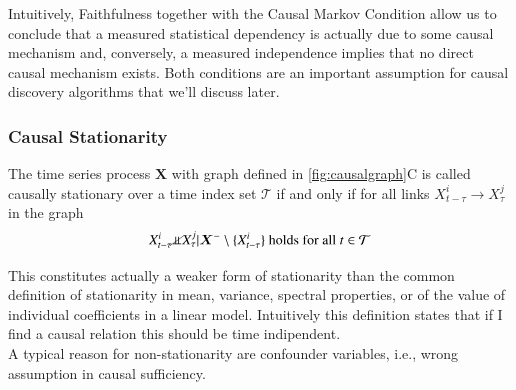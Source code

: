 Intuitively, Faithfulness together with the Causal Markov Condition 
allow us to conclude that a measured
statistical dependency is actually due to some causal mechanism and, conversely,
a measured independence implies that no direct causal mechanism exists.
Both conditions are an important assumption for causal discovery algorithms that we'll discuss later.

\subsubsection*{Causal Stationarity}
\begin{tcolorbox}[colback=red!5!white,colframe=red!75!black,title=\textbf{Definition}]
    The time series process $\bm{X}$ with graph defined in \ref{fig:causalgraph}C is called causally stationary 
    over a time index set $\mathcal{T}$ if and only if for all links $X^i_{t-\tau}\rightarrow X^j_\tau$ in the graph
    \begin{equation*}
        X^i_{t-\tau}\cancel{\Perp}X^j_\tau|\bm{X}^-\setminus\{X^i_{t-\tau}\}\text{ holds for all } t\in\mathcal{T}
    \end{equation*}
\end{tcolorbox}
This constitutes actually a weaker form of stationarity than the common definition of stationarity in mean, 
variance, spectral properties, or of the value of individual coefficients in a linear model.
Intuitively this definition states that if I find a causal relation this should be time indipendent.\\

A typical reason for non-stationarity are confounder variables, i.e., wrong assumption in causal sufficiency.

